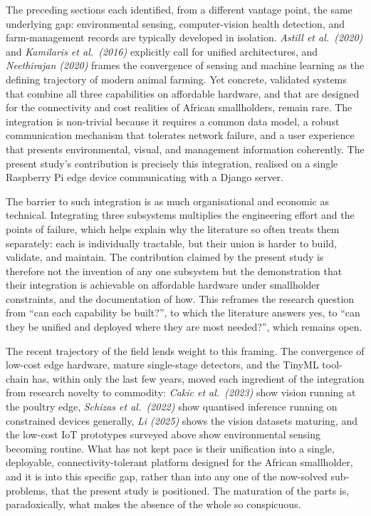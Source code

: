 \documentclass[12pt,a4paper]{report}
\begin{document}
The preceding sections each identified, from a different vantage point, the same underlying gap: environmental sensing, computer-vision health detection, and farm-management records are typically developed in isolation. \textit{Astill et al.\ (2020)} and \textit{Kamilaris et al.\ (2016)} explicitly call for unified architectures, and \textit{Neethirajan (2020)} frames the convergence of sensing and machine learning as the defining trajectory of modern animal farming. Yet concrete, validated systems that combine all three capabilities on affordable hardware, and that are designed for the connectivity and cost realities of African smallholders, remain rare. The integration is non-trivial because it requires a common data model, a robust communication mechanism that tolerates network failure, and a user experience that presents environmental, visual, and management information coherently. The present study's contribution is precisely this integration, realised on a single Raspberry Pi edge device communicating with a Django server.

The barrier to such integration is as much organisational and economic as technical. Integrating three subsystems multiplies the engineering effort and the points of failure, which helps explain why the literature so often treats them separately: each is individually tractable, but their union is harder to build, validate, and maintain. The contribution claimed by the present study is therefore not the invention of any one subsystem but the demonstration that their integration is achievable on affordable hardware under smallholder constraints, and the documentation of how. This reframes the research question from ``can each capability be built?'', to which the literature answers yes, to ``can they be unified and deployed where they are most needed?'', which remains open.

The recent trajectory of the field lends weight to this framing. The convergence of low-cost edge hardware, mature single-stage detectors, and the TinyML tool-chain has, within only the last few years, moved each ingredient of the integration from research novelty to commodity: \textit{Cakic et al.\ (2023)} show vision running at the poultry edge, \textit{Schizas et al.\ (2022)} show quantised inference running on constrained devices generally, \textit{Li (2025)} shows the vision datasets maturing, and the low-cost IoT prototypes surveyed above show environmental sensing becoming routine. What has not kept pace is their unification into a single, deployable, connectivity-tolerant platform designed for the African smallholder, and it is into this specific gap, rather than into any one of the now-solved sub-problems, that the present study is positioned. The maturation of the parts is, paradoxically, what makes the absence of the whole so conspicuous.
\end{document}
